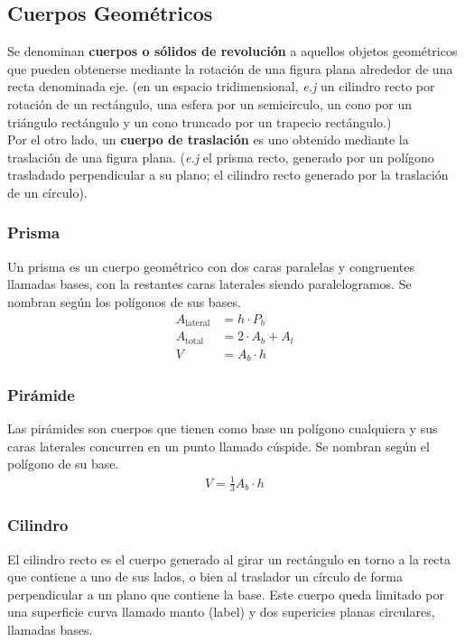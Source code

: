 \subsection{Cuerpos Geométricos}
Se denominan \textbf{cuerpos o sólidos de revolución} a aquellos objetos geométricos que pueden obtenerse mediante la rotación de una figura plana alrededor de una recta denominada eje. (en un espacio tridimensional, \textit{e.j} un cilindro recto por rotación de un rectángulo, una esfera por un semicirculo, un cono por un triángulo rectángulo y un cono truncado por un trapecio rectángulo.)\\

Por el otro lado, un \textbf{cuerpo de traslación} es uno obtenido mediante la traslación de una figura plana. (\textit{e.j} el prisma recto, generado por un polígono trasladado perpendicular a su plano; el cilindro recto generado por la traslación de un círculo).
\subsubsection{Prisma}
Un prisma es un cuerpo geométrico con dos caras paralelas y congruentes llamadas bases, con la restantes caras laterales siendo paralelogramos. Se nombran según los polígonos de sus bases. \\
\begin{equation*}
    \begin{split} 
    A_{\text{lateral}} &= h \cdot P_b\\
    A_{\text{total}} &= 2\cdot A_b + A_l\\
    V &= A_b\cdot h
    \end{split}
\end{equation*}

\subsubsection{Pirámide}
Las pirámides son cuerpos que tienen como base un polígono cualquiera y sus caras laterales concurren en un punto llamado cúspide. Se nombran según el polígono de su base.\\
\begin{equation*}
    \begin{aligned} 
    V = \frac{1}{3}A_b\cdot h
    \end{aligned}
\end{equation*}
\subsubsection{Cilindro}
El cilindro recto es el cuerpo generado al girar un rectángulo en torno a la recta que contiene a uno de sus lados, o bien al traslador un círculo de forma perpendicular a un plano que contiene la base. Este cuerpo queda limitado por una superficie curva llamado manto (label) y dos supericies planas circulares, llamadas bases.

